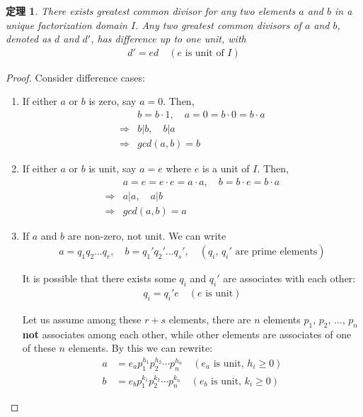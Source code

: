\documentclass[utf8]{ctexbook}
\newtheorem{theorem}{定理}[section]
\begin{document}
\begin{theorem}\label{theorem_UDF_GCD_existence_unique_up_to_unit}
There exists greatest common divisor for any two elements $a$ and $b$ in a unique factorization domain $I$. Any two greatest common divisors of $a$ and $b$, denoted as $d$ and $d'$, has difference up to one unit, with
\begin{align*}
d' = e d \quad (e \mbox{ is unit of } I)
\end{align*} 
\end{theorem}

\begin{proof}
Consider difference cases:
\begin{enumerate}
\item{If either $a$ or $b$ is zero, say $a=0$. Then, 
\begin{align*}
& b = b \cdot 1,\quad a = 0 = b \cdot 0 = b \cdot a \\
 \Longrightarrow & b | b, \quad b | a \\
 \Longrightarrow & gcd(a,b) = b 
\end{align*}
}
\item{If either $a$ or $b$ is unit, say $a=e$ where $e$ is a unit of $I$. Then,
\begin{align*}
& a = e = e \cdot e = a \cdot a, \quad b = b \cdot e = b \cdot a \\
\Longrightarrow & a | a, \quad a | b \\
\Longrightarrow & gcd(a,b) = a 
\end{align*}
}
\item{If $a$ and $b$ are non-zero, not unit. We can write
\begin{align*}
a = q_1 q_2 \ldots q_r, \quad b = q_1 ' q_2 ' \ldots q_s ' , \quad (q_i, \, q_i ' \mbox{ are prime elements})
\end{align*}

It is possible that there exists some $q_i$ and $q_i '$ are associates with each other:
\begin{align*}
q_i = q_i ' e \quad (e \mbox{ is unit})
\end{align*}

Let us assume among these $r+s$ elements, there are $n$ elements $p_1$, $p_2$, $\ldots$, $p_n$ \textbf{not} associates among each other, while other elements are associates of one of these $n$ elements. By this we can rewrite:
\begin{align*}
a &= e_a p_1 ^{h_1} p_2 ^{h_2} \cdots p_n ^{h_n} \quad (e_a \mbox{ is unit},\, h_i \geq 0) \\
b&= e_b p_1 ^{k_1} p_2 ^{k_2} \cdots p_n ^{k_n} \quad (e_b \mbox{ is unit}, \, k_i \geq 0 )   
\end{align*}

}
\end{enumerate}
\end{proof}
\end{document}
